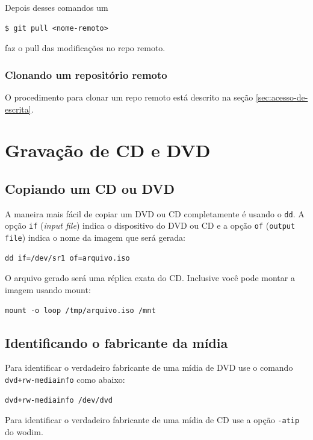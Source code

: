 \documentclass[12pt,brazil]{book}
\begin{document}
Depois desses comandos um
\begin{verbatim}
$ git pull <nome-remoto>
\end{verbatim}
faz o pull das modificações no repo remoto.

\subsection{Clonando um repositório remoto}
\label{sec:clone}

O procedimento para clonar um repo remoto está descrito na seção
\ref{sec:acesso-de-escrita}.

\chapter{Gravação de CD e DVD}
\label{cha:gravacao-de-cd}

\section{Copiando um CD ou DVD}
\label{sec:copiando-um-cd}

A maneira mais fácil de copiar um DVD ou CD completamente é usando o
\texttt{dd}. A opção \texttt{if} (\textit{input file}) indica o
dispositivo do DVD ou CD e a opção \texttt{of} (\texttt{output file})
indica o nome da imagem que será gerada:

\begin{verbatim}
dd if=/dev/sr1 of=arquivo.iso
\end{verbatim}

O arquivo gerado será uma réplica exata do CD. Inclusive você pode
montar a imagem usando mount:

\begin{verbatim}
mount -o loop /tmp/arquivo.iso /mnt
\end{verbatim}

\section{Identificando o fabricante da mídia}
\label{sec:ident-o-fabr}

Para identificar o verdadeiro fabricante de uma mídia de DVD use o
comando \texttt{dvd+rw-mediainfo} como abaixo:

\begin{verbatim}
dvd+rw-mediainfo /dev/dvd
\end{verbatim}

Para identificar o verdadeiro fabricante de uma mídia de CD use a
opção \texttt{-atip} do wodim.
\end{document}
